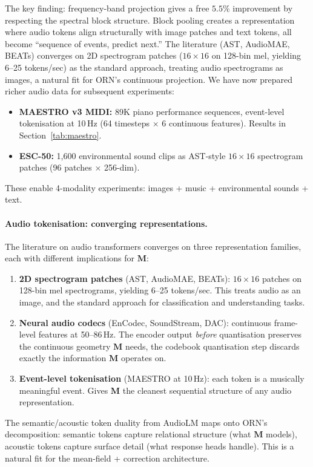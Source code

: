\documentclass[11pt, a4paper]{article}
\newcommand{\M}{\mathbf{M}}
\theoremstyle{plain}
\theoremstyle{remark}
\begin{document}
The key finding: frequency-band projection gives a free $5.5\%$ improvement by respecting the spectral block structure.
Block pooling creates a representation where audio tokens align structurally with image patches and text tokens, all become ``sequence of events, predict next.''
The literature (AST, AudioMAE, BEATs) converges on 2D spectrogram patches ($16{\times}16$ on 128-bin mel, yielding 6--25 tokens/sec) as the standard approach, treating audio spectrograms as images, a natural fit for ORN's continuous projection.
We have now prepared richer audio data for subsequent experiments:
\begin{itemize}[nosep]
    \item \textbf{MAESTRO v3 MIDI:} 89K piano performance sequences, event-level tokenisation at 10\,Hz (64 timesteps $\times$ 6 continuous features).  Results in Section~\ref{tab:maestro}.
    \item \textbf{ESC-50:} 1{,}600 environmental sound clips as AST-style $16{\times}16$ spectrogram patches (96 patches $\times$ 256-dim).
\end{itemize}
These enable 4-modality experiments: images + music + environmental sounds + text.

\paragraph{Audio tokenisation: converging representations.}
The literature on audio transformers converges on three representation families, each with different implications for $\M$:
\begin{enumerate}[nosep]
    \item \textbf{2D spectrogram patches} (AST, AudioMAE, BEATs): $16{\times}16$ patches on 128-bin mel spectrograms, yielding 6--25 tokens/sec.  This treats audio as an image, and the standard approach for classification and understanding tasks.
    \item \textbf{Neural audio codecs} (EnCodec, SoundStream, DAC): continuous frame-level features at 50--86\,Hz.  The encoder output \emph{before} quantisation preserves the continuous geometry $\M$ needs, the codebook quantisation step discards exactly the information $\M$ operates on.
    \item \textbf{Event-level tokenisation} (MAESTRO at 10\,Hz): each token is a musically meaningful event.  Gives $\M$ the cleanest sequential structure of any audio representation.
\end{enumerate}
The semantic/acoustic token duality from AudioLM maps onto ORN's decomposition: semantic tokens capture relational structure (what $\M$ models), acoustic tokens capture surface detail (what response heads handle).  This is a natural fit for the mean-field + correction architecture.
\end{document}
